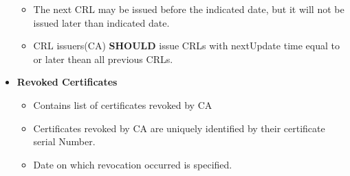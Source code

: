 \documentclass[a4paper]{article}
\begin{document}
\begin{itemize}
\begin{itemize}
                \item The next CRL may be issued before the indicated date, but it will not
                    be issued later than indicated date.
                \item CRL issuers(CA) \textbf{SHOULD} issue CRLs with nextUpdate time equal
                    to or later thean all previous CRLs.
            \end{itemize}
        \item \textbf{Revoked Certificates}
            \begin{itemize}
                \item Contains list of certificates revoked by CA
                \item Certificates revoked by CA are uniquely identified by their certificate serial Number. 
                \item Date on which revocation occurred is specified.
            \end{itemize}
    \end{itemize}
\end{document}
